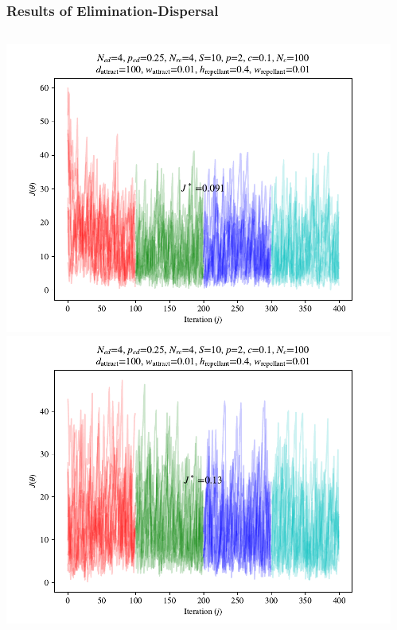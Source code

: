 \documentclass{beamer}
\begin{document}
\begin{frame}
\frametitle{Results of Elimination-Dispersal}
\begin{columns}[T]
    \begin{center}
      \includegraphics[scale=0.3]{assets/rastrigin_colony_ed_0_J}
      \includegraphics[scale=0.3]{assets/rastrigin_colony_ed_1_J}
    \end{center}
  \begin{center}

\end{center}
\end{columns}
\end{frame}
\end{document}
